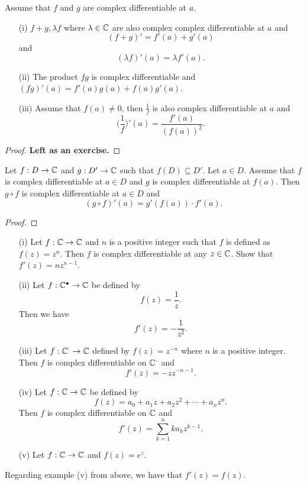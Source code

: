 \documentclass[a4paper]{report}
\begin{document}
\begin{theorem}
    Assume that \( f  \) and \( g  \) are complex differentiable at \( a \).
    \begin{enumerate}
        \item[(i)] \( f + g , \lambda f  \) where \( \lambda \in \mathbb{C}  \) are also complex complex differentiable at \( a  \) and 
            \[  (f+g)' = f'(a) + g'(a)  \]
            and
            \[  (\lambda f)' (a) = \lambda f'(a). \]
        \item[(ii)] The product \( fg  \) is complex differentiable and \( (fg)'(a) = f'(a) g(a) + f(a) g'(a) \).
        \item[(iii)] Assume that \( f(a) \neq 0  \), then \( \frac{ 1 }{ f }   \) is also complex differentiable at \( a  \) and 
            \[  \Big(  \frac{ 1 }{ f }  \Big)'(a) = \frac{ f'(a) }{ (f(a))^{2} }.  \]
    \end{enumerate}
\end{theorem}
\begin{proof}
\textbf{Left as an exercise.}
\end{proof}

\begin{theorem}
    Let \( f: D \to \mathbb{C}  \) and \( g: D' \to \mathbb{C}  \) such that \( f(D) \subseteq D'  \). Let \( a \in D  \). Assume that \( f \) is complex differentiable at \( a \in D  \) and \( g  \) is complex differentiable at \( f(a) \). Then \( g \circ f  \) is complex differentiable at \( a \in D  \) and 
    \[  (g \circ f)'(a) = g'(f(a)) \cdot f'(a). \]
\end{theorem}
\begin{proof}

\end{proof}

\begin{eg}
   \begin{enumerate}
       \item[(i)] Let \( f: \mathbb{C} \to \mathbb{C}  \) and \( n  \) is a positive integer such that \( f \) is defined as \( f(z) = z^{n} \). Then \( f  \) is complex differentiable at any \( z \in \mathbb{C}  \). Show that \( f'(z) = n z^{n-1} \).
        \item[(ii)] Let \( f: \mathbb{C}^{\bullet} \to \mathbb{C}  \) be defined by 
            \[  f(z) = \frac{ 1 }{ z }. \]
            Then we have 
            \[  f'(z) = - \frac{ 1 }{ z^{2} }. \]
        \item[(iii)] Let \( f: \mathbb{C}^{\cdot} \to \mathbb{C}  \) defined by \( f(z) = z^{-n} \) where \(  n \) is a positive integer. Then \( f  \) is complex differentiable on \( \mathbb{C}^{\cdot} \) and
            \[  f'(z) = -z z^{-n-1}. \]
        \item[(iv)] Let \( f: \mathbb{C} \to \mathbb{C}  \) be defined by
            \[  f(z) = {a}_{0} + {a}_{1}z + {a}_{2} z^{2} + \cdots + {a}_{n} z^{n}. \]
            Then \( f  \) is complex differentiable on \( \mathbb{C}  \) and 
            \[  f'(z) = \sum_{ k=1  }^{ n } k {a}_{k} z^{k-1}. \]
        \item[(v)] Let \( f: \mathbb{C} \to \mathbb{C}  \) and \( f(z) = e^{z} \).
   \end{enumerate} 
\end{eg}

Regarding example (v) from above, we have that \( f'(z) = f(z) \).
\end{document}
